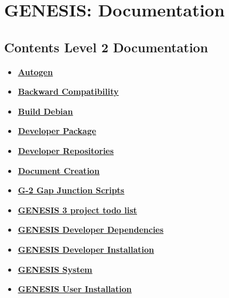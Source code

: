 \documentclass[12pt]{article}
\begin{document}
\section*{GENESIS: Documentation}

\subsection*{Contents Level 2 Documentation}

\begin{itemize}

\item \href{../autogen/autogen.pdf}{\bf \underline{Autogen}}

\item \href{../backward-compatibility/backward-compatibility.pdf}{\bf \underline{Backward Compatibility}}

\item \href{../build-debian/build-debian.pdf}{\bf \underline{Build Debian}}

\item \href{../developer-package/developer-package.pdf}{\bf \underline{Developer Package}}

\item \href{../developer-repository/developer-repository.pdf}{\bf \underline{Developer Repositories}}

\item \href{../document-create/document-create.pdf}{\bf \underline{Document Creation}}

\item \href{../g2-gap-junction/g2-gap-junction.pdf}{\bf \underline{G-2 Gap Junction Scripts}}

\item \href{../project-todo/project-todo.pdf}{\bf \underline{GENESIS 3 project todo list}}

\item \href{../genesis-dependencies/genesis-dependencies.pdf}{\bf \underline{GENESIS Developer Dependencies}}

\item \href{../installation-developer/installation-developer.pdf}{\bf \underline{GENESIS Developer Installation}}

\item \href{../genesis-system/genesis-system.pdf}{\bf \underline{GENESIS System}}

\item \href{../installation-user/installation-user.pdf}{\bf \underline{GENESIS User Installation}}


\end{itemize}
\end{document}
